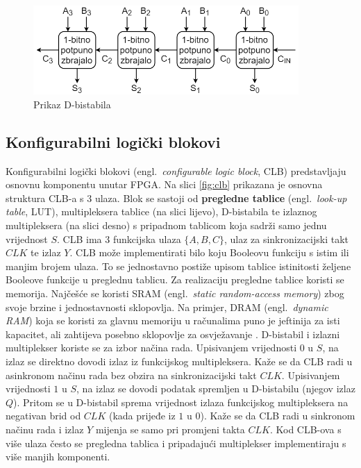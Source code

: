 \documentclass[times, utf8, diplomski]{fer}
\begin{document}
\begin{figure}[htb]
	\centering
	\includegraphics[width=0.9\textwidth]{img/ripple_adder.png}
	\caption{Prikaz D-bistabila}
	\label{fig:ripple-adder}
\end{figure}

\subsection{Konfigurabilni logički blokovi} \label{subsec:clb}

Konfigurabilni logički blokovi (engl.~\textit{configurable logic block}, CLB) predstavljaju osnovnu komponentu unutar FPGA. Na slici \ref{fig:clb} prikazana je osnovna struktura CLB-a s $3$ ulaza. Blok se sastoji od \textbf{pregledne tablice} (engl.~\textit{look-up table}, LUT), multipleksera tablice (na slici lijevo), D-bistabila te izlaznog multipleksera (na slici desno) s pripadnom tablicom koja sadrži samo jednu vrijednost $S$. CLB ima $3$ funkcijska ulaza $\{A, B, C\}$, ulaz za sinkronizacijski takt $CLK$ te izlaz $Y$. CLB može implementirati bilo koju Booleovu funkciju s istim ili manjim brojem ulaza. To se jednostavno postiže upisom tablice istinitosti željene Booleove funkcije u preglednu tablicu. Za realizaciju pregledne tablice koristi se memorija. Najčešće se koristi SRAM (engl.~\textit{static random-access memory}) zbog svoje brzine i jednostavnosti sklopovlja. Na primjer, DRAM (engl.~\textit{dynamic RAM}) koja se koristi za glavnu memoriju u računalima puno je jeftinija za isti kapacitet, ali zahtijeva posebno sklopovlje za osvježavanje \cite{book:memory}. D-bistabil i izlazni multiplekser koriste se za izbor načina rada. Upisivanjem vrijednosti $0$ u $S$, na izlaz se direktno dovodi izlaz iz funkcijskog multipleksera. Kaže se da CLB radi u asinkronom načinu rada bez obzira na sinkronizacijski takt $CLK$. Upisivanjem vrijednosti $1$ u $S$, na izlaz se dovodi podatak spremljen u D-bistabilu (njegov izlaz $Q$). Pritom se u D-bistabil sprema vrijednost izlaza funkcijskog multipleksera na negativan brid od $CLK$ (kada prijeđe iz $1$ u $0$). Kaže se da CLB radi u sinkronom načinu rada i izlaz $Y$ mijenja se samo pri promjeni takta $CLK$. Kod CLB-ova s više ulaza često se pregledna tablica i pripadajući multiplekser implementiraju s više manjih komponenti.
\end{document}
